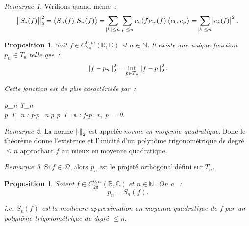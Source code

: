 \documentclass{report}
\newtheorem{prp}[thm]{Proposition}
\theoremstyle{definition}
\theoremstyle{remark}
\newtheorem*{rmq}{Remarque}
\numberwithin{equation}{section}
\newcommand{\C}{\mathbb C}
\newcommand{\R}{\mathbb R}
\newcommand{\N}{\mathbb N}
\newcommand{\scpr}[2]{\left\langle #1, #2\right\rangle}
\newcommand{\CmT}[2]{C^{#1,m}_{#2}}
\newcommand{\CzmT}[1]{\CmT 0{#1}}
\newcommand{\Czm}{\CzmT{2\pi}}
\begin{document}
			\begin{rmq} Vérifions quand même~:
			\begin{equation}
				\norm {S_n(f)}_2^2 = \scpr {S_n(f)}{S_n(f)} = \sum_{\abs k \leq n}\sum_{\abs p \leq n}c_k(f)c_p(f)\scpr {e_k}{e_p}
					= \sum_{\abs k \leq n}\abs {c_k(f)}^2.
			\end{equation}
			\end{rmq}

			\begin{prp} Soit $f \in \Czm(\R, \C)$ et $n \in \N$. Il existe une unique fonction $p_n \in T_n$ telle que~:
			\begin{equation}
				\norm {f-p_n}_2^2 = \inf_{p \in T_n}\norm {f-p}_2^2.
			\end{equation}

			Cette fonction est de plus caractérisée par~:
			\begin{subnumcases}{}
				p_n \in T_n \\
				\forall p \in T_n : f-p_n \perp p  \forall p \in T_n : \scpr {f-p_n}p = 0.
			\end{subnumcases}
			\end{prp}

			\begin{rmq} La norme $\norm \cdot_2$ est appelée \textit{norme en moyenne quadratique}. Donc le théorème donne l'existence et l'unicité d'un
			polynôme trigonométrique de degré $\leq n$ approchant $f$ au mieux en moyenne quadratique.
			\end{rmq}

			\begin{rmq} Si $f \in \mathcal D$, alors $p_n$ est le projeté orthogonal défini sur $T_n$.
			\end{rmq}

			\begin{prp} Soient $f \in \Czm(\R, \C)$ et $n \in \N$. On a ~:
			\begin{equation}
				p_n = S_n(f).
			\end{equation}

			i.e. $S_n(f)$ est la meilleure approximation en moyenne quadratique de $f$ par un polynôme trigonométrique de degré $\leq n$.
			\end{prp}
\end{document}
